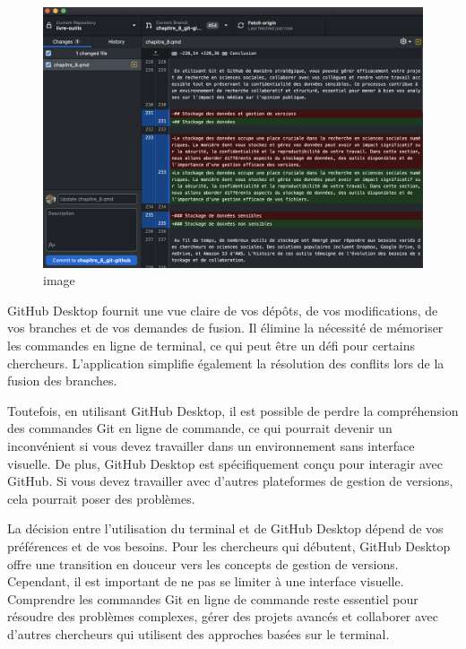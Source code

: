 \documentclass[
  letterpaper,
]{scrbook}
\begin{document}
\begin{figure}

{\centering \includegraphics{images/chapitre8_gitdesktop.png}

}

\caption{image}

\end{figure}

GitHub Desktop fournit une vue claire de vos dépôts, de vos
modifications, de vos branches et de vos demandes de fusion. Il élimine
la nécessité de mémoriser les commandes en ligne de terminal, ce qui
peut être un défi pour certains chercheurs. L'application simplifie
également la résolution des conflits lors de la fusion des branches.

Toutefois, en utilisant GitHub Desktop, il est possible de perdre la
compréhension des commandes Git en ligne de commande, ce qui pourrait
devenir un inconvénient si vous devez travailler dans un environnement
sans interface visuelle. De plus, GitHub Desktop est spécifiquement
conçu pour interagir avec GitHub. Si vous devez travailler avec d'autres
plateformes de gestion de versions, cela pourrait poser des problèmes.

La décision entre l'utilisation du terminal et de GitHub Desktop dépend
de vos préférences et de vos besoins. Pour les chercheurs qui débutent,
GitHub Desktop offre une transition en douceur vers les concepts de
gestion de versions. Cependant, il est important de ne pas se limiter à
une interface visuelle. Comprendre les commandes Git en ligne de
commande reste essentiel pour résoudre des problèmes complexes, gérer
des projets avancés et collaborer avec d'autres chercheurs qui utilisent
des approches basées sur le terminal.
\end{document}
